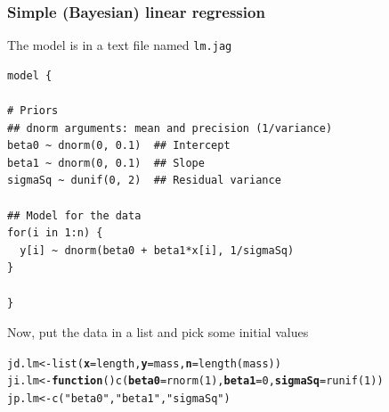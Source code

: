 \documentclass[color=usenames,dvipsnames]{beamer}\usepackage[]{graphicx}\usepackage[]{xcolor}
\makeatletter
\newcommand{\hlnum}[1]{\textcolor[rgb]{0.69,0.494,0}{#1}}%
\newcommand{\hlstr}[1]{\textcolor[rgb]{0.749,0.012,0.012}{#1}}%
\newcommand{\hlstd}[1]{\textcolor[rgb]{0,0,0}{#1}}%
\newcommand{\hlkwa}[1]{\textcolor[rgb]{0,0,0}{\textbf{#1}}}%
\newcommand{\hlkwb}[1]{\textcolor[rgb]{0,0.341,0.682}{#1}}%
\newcommand{\hlkwc}[1]{\textcolor[rgb]{0,0,0}{\textbf{#1}}}%
\newcommand{\hlkwd}[1]{\textcolor[rgb]{0.004,0.004,0.506}{#1}}%
\newenvironment{kframe}{%
 \def\at@end@of@kframe{}%
 \ifinner\ifhmode%
  \def\at@end@of@kframe{\end{minipage}}%
  \begin{minipage}{\columnwidth}%
 \fi\fi%
 \def\FrameCommand##1{\hskip\@totalleftmargin \hskip-\fboxsep
 \colorbox{shadecolor}{##1}\hskip-\fboxsep
     \hskip-\linewidth \hskip-\@totalleftmargin \hskip\columnwidth}%
 \MakeFramed {\advance\hsize-\width
   \@totalleftmargin\z@ \linewidth\hsize
   \@setminipage}}%
 {\par\unskip\endMakeFramed%
 \at@end@of@kframe}
\newenvironment{knitrout}{}{} %
\makeatother
\begin{document}
\begin{frame}[fragile]
  \frametitle{Simple (Bayesian) linear regression}
  \small
  The model is in a text file named {\tt lm.jag} \\
\begin{knitrout}\scriptsize
{}\color{fgcolor}\begin{kframe}
\begin{verbatim}
model {

# Priors
## dnorm arguments: mean and precision (1/variance)
beta0 ~ dnorm(0, 0.1)  ## Intercept  
beta1 ~ dnorm(0, 0.1)  ## Slope
sigmaSq ~ dunif(0, 2)  ## Residual variance

## Model for the data
for(i in 1:n) {
  y[i] ~ dnorm(beta0 + beta1*x[i], 1/sigmaSq)
}

}
\end{verbatim}
\end{kframe}
\end{knitrout}
\pause
\vfill
Now, put the data in a list and pick some initial values
\begin{knitrout}\footnotesize
{}\color{fgcolor}\begin{kframe}
\begin{alltt}
\hlstd{jd.lm} \hlkwb{<-} \hlkwd{list}\hlstd{(}\hlkwc{x}\hlstd{=length,} \hlkwc{y}\hlstd{=mass,} \hlkwc{n}\hlstd{=}\hlkwd{length}\hlstd{(mass))}
\hlstd{ji.lm} \hlkwb{<-} \hlkwa{function}\hlstd{()} \hlkwd{c}\hlstd{(}\hlkwc{beta0}\hlstd{=}\hlkwd{rnorm}\hlstd{(}\hlnum{1}\hlstd{),} \hlkwc{beta1}\hlstd{=}\hlnum{0}\hlstd{,} \hlkwc{sigmaSq}\hlstd{=}\hlkwd{runif}\hlstd{(}\hlnum{1}\hlstd{))}
\hlstd{jp.lm} \hlkwb{<-} \hlkwd{c}\hlstd{(}\hlstr{"beta0"}\hlstd{,} \hlstr{"beta1"}\hlstd{,} \hlstr{"sigmaSq"}\hlstd{)}
\end{alltt}
\end{kframe}
\end{knitrout}
\end{frame}
\end{document}
